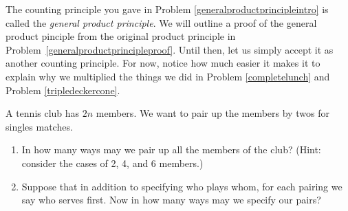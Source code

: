 The counting principle you gave in Problem
\ref{generalproductprincipleintro} is called the {\em general product
  principle}. We will outline
a proof of the general product pinciple from the original product
principle in Problem~\ref{generalproductprincipleproof}.  Until then,
let us simply accept it as another counting principle. For now, notice
how much easier it makes it to explain why we multiplied the things we
did in Problem \ref{completelunch} and Problem \ref{tripledeckercone}.
\bp

\itemi A tennis club has $2n$ members.  We want to pair up the
members by twos for singles matches. \label{tennispairings1} 
\begin{enumerate}
\item In how many ways may we pair up all the members of the club? (Hint: consider the cases
  of 2, 4, and 6 members.) 

\item Suppose that in addition to specifying who plays whom, for each
  pairing we say who serves first.  Now in how many ways may we
  specify our pairs?
\end{enumerate}


